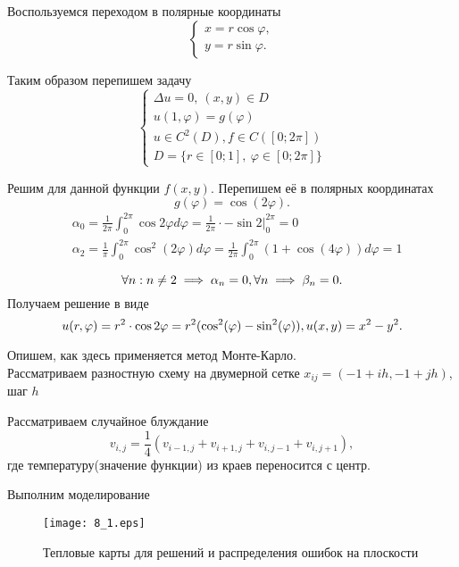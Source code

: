 \documentclass[11pt]{article}
\begin{document}
\subsection{}
Воспользуемся переходом в полярные координаты
$$
    \begin{cases}
        x = r \cos{\varphi}, \\
        y = r \sin{\varphi}.
    \end{cases}
$$

Таким образом перепишем задачу
$$
    \begin{cases}
    \Delta u=0,~ (x, y) \in D \\
    u(1, \varphi)= g(\varphi) \\
    u \in C^2(D), f \in C([0; 2\pi]) \\
    D= \{ r \in [0;1],~ \varphi \in [0;2\pi] \}
    \end{cases}
$$

Решим для данной функции $f(x,y)$. Перепишем её в полярных координатах
$$
    g(\varphi) = \cos(2\varphi).
$$
$$
    \begin{aligned}
    & \alpha_0 = \frac{1}{2 \pi} \int_0^{2 \pi} \cos 2 \varphi d\varphi=\frac{1}{2 \pi} \cdot-\left.\sin 2\right|_0 ^{2\pi}=0 \\
    & \alpha_2 = \frac{1}{\pi} \int_0^{2\pi} \cos ^2(2 \varphi) d\varphi=\frac{1}{2\pi} \int_0^{2 \pi}(1+\cos (4\varphi) ) d \varphi = 1 \\
    \end{aligned}
$$
$$
    \forall n : n \ne 2 \implies \alpha_n = 0, \\
    \forall n \implies \beta_n = 0. \\
$$
Получаем решение в виде
$$
    u(r, \varphi)=r^2 \cdot \cos 2 \varphi = r^2 (\cos^2(\varphi) - \sin^2(\varphi)), \\
    u(x, y) = x^2 - y^2.
$$

Опишем, как здесь применяется метод Монте-Карло. \\
Рассматриваем разностную схему на двумерной сетке $x_{ij} = (-1 + ih, -1 + jh)$, шаг $h$

Рассматриваем случайное блуждание
$$
  v_{i,j} = \frac{1}{4}( v_{i-1,j} + v_{i+1,j} + v_{i,j-1} + v_{i,j+1}),
$$
где температуру(значение функции) из краев переносится с центр. 

Выполним моделирование 

\begin{figure}[ht]
    \texttt{[image: 8\_1.eps]} 
    \caption{Тепловые карты для решений и распределения ошибок на плоскости }
\end{figure} 
\end{document}
